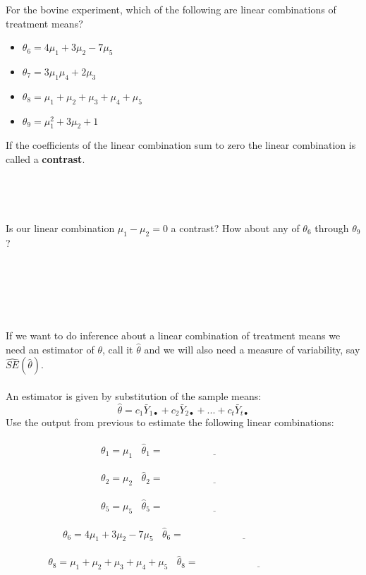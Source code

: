 For the bovine experiment, which of the following are linear combinations of treatment means?
\begin{itemize}
    \item $\theta_6=4\mu_{1}+3\mu_{2}-7\mu_{5}$\\ %
    \item $\theta_7=3\mu_{1}\mu_{4}+2\mu_{3}$ \\    %
    \item $\theta_8=\mu_{1}+\mu_{2}+\mu_{3}+\mu_{4}+\mu_{5}$\\  %
    \item $\theta_9=\mu_{1}^2+3\mu_{2}+1$\\   %
\end{itemize}
If the coefficients of the linear combination sum to zero the linear combination is called a \textbf{contrast}.\\~\\~\\~\\~\\
Is our linear combination $\mu_1-\mu_2=0$ a contrast?  How about any of $\theta_6$ through $\theta_9$?\\~\\~\\~\\~\\~\\

\newpage

If we want to do inference about a linear combination of treatment means we need an estimator of $\theta$, call it $\hat{\theta}$ and we will also need a measure of variability, say $\hat{SE}(\hat{\theta})$.\\~\\
An estimator is given by substitution of the sample means: 
    $$\hat{\theta}=c_{1}\bar{Y}_{1\bullet}+c_{2}\bar{Y}_{2\bullet}+...+c_{t}\bar{Y}_{t\bullet}$$
 Use the output from previous to estimate the following linear combinations:  \\~\\
    $$\theta_1=\mu_1~~~~\hat{\theta}_1=\underline{~~~~~~~~~~~~~~~~~~~~~~~~~~~~~~~~~~~~~~~~~~~~~~~}$$~\\
    $$\theta_2=\mu_2~~~~\hat{\theta}_2=\underline{~~~~~~~~~~~~~~~~~~~~~~~~~~~~~~~~~~~~~~~~~~~~~~~}$$~\\
    $$\theta_5=\mu_5~~~~\hat{\theta}_5=\underline{~~~~~~~~~~~~~~~~~~~~~~~~~~~~~~~~~~~~~~~~~~~~~~~}$$~\\
    $$\theta_6=4\mu_{1}+3\mu_{2}-7\mu_{5}~~~~\hat{\theta}_6=\underline{~~~~~~~~~~~~~~~~~~~~~~~~~~~~~~~~~~~~~~~~~~~~~~~~~~~~~~~}$$~\\
    $$\theta_8=\mu_{1}+\mu_{2}+\mu_{3}+\mu_{4}+\mu_{5}~~~~\hat{\theta}_8=\underline{~~~~~~~~~~~~~~~~~~~~~~~~~~~~~~~~~~~~~~~~~~~~~~~~~~~~~~~}$$


